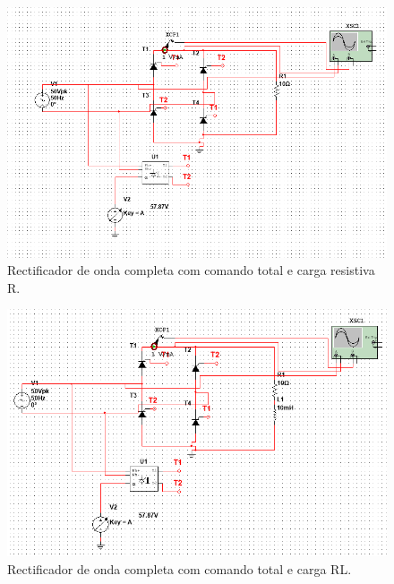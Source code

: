 \documentclass[a4paper,11pt]{article}
\numberwithin{equation}{section}
\begin{document}
\begin{figure}[h]
	\centering
	\includegraphics[keepaspectratio=true, scale=0.5]{img/circuito1}
	\caption{Rectificador de onda completa com comando total e carga resistiva R.}
	\label{fig:circuit_3}
	\vspace{-0.8em}
\end{figure}

\begin{figure}[h]
	\centering
	\includegraphics[keepaspectratio=true, scale=0.5]{img/circuito2}
	\caption{Rectificador de onda completa com comando total e carga RL.}
	\label{fig:circuit_4}
	\vspace{-0.8em}
\end{figure}
\end{document}

